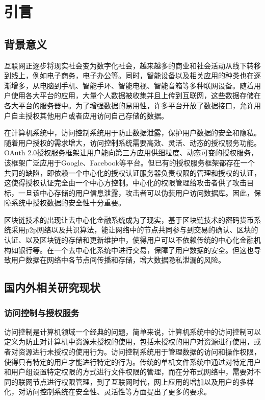 
\chapter{引言}
\label{cha:intro}

\section{背景意义}

互联网正逐步将现实社会变为数字化社会，越来越多的商业和社会活动从线下转移到线上，例如电子商务，电子办公等。同时，智能设备以及相关应用的种类也在逐渐增多，从电脑到手机、智能手环、智能电视、智能音箱等多种联网设备。随着用户使用各大平台的应用，大量个人数据被收集并且上传到互联网，这些数据存储在各大平台的服务器中。为了增强数据的易用性，许多平台开放了数据接口，允许用户自主授权其他用户或者应用访问自己存储的数据。

在计算机系统中，访问控制系统用于防止数据泄露，保护用户数据的安全和隐私。随着用户授权的需求增大，访问控制系统需要高效、灵活、动态的授权服务功能。OAuth 2.0授权服务框架让用户能向第三方应用供细粒度、动态可变的授权服务，该框架广泛应用于Google、Facebook等平台。但已有的授权服务框架都存在一个共同的缺陷，即依赖一个中心化的授权认证服务器负责权限的管理和授权的认证，这使得授权认证完全由一个中心方控制。中心化的权限管理给攻击者供了攻击目标，一旦该中心存储的用户信息泄露，攻击者可以伪装用户访问数据库。因此，保障系统中授权数据的安全性十分重要。

区块链技术的出现让去中心化金融系统成为了现实，基于区块链技术的密码货币系统采用p2p网络以及共识算法，能让网络中的节点共同参与到交易的确认、区块的认证、以及区块链的存储和更新维护中，使得用户可以不依赖传统的中心化金融机构如银行等。在一个去中心化系统中进行交易，保障了用户数据的安全。但这也导致用户数据在网络中各节点间传播和存储，增大数据隐私泄漏的风险。

\section{国内外相关研究现状}

\subsection{访问控制与授权服务}

访问控制是计算机领域一个经典的问题，简单来说，计算机系统中的访问控制可以定义为防止对计算机中资源未授权的使用，包括未授权的用户对资源进行使用，或者对资源进行未授权的使用行为。访问控制系统用于管理数据的访问和操作权限，使得只有特定的用户才能进行特定的行为。传统的单机文件系统中通过对特定用户和用户组设置特定权限的方式进行文件权限的管理，而在分布式网络中，需要对不同的联网节点进行权限管理，到了互联网时代，网上应用的增加以及用户的多样化，对访问控制系统在安全性、灵活性等方面提出了更多的要求。

